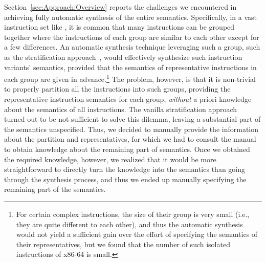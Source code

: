 Section~\ref{sec:Approach:Overview} reports the challenges we encountered in achieving fully automatic synthesis of the entire \ISA semantics.
Specifically, in a vast instruction set like \ISA {}, it is common that many instructions can be grouped together where the instructions of each group are similar to each other except for a few differences.
An automatic synthesis technique leveraging such a group, such as the stratification approach~\cite{Heule2016a}, would effectively synthesize such instruction variants' semantics, provided that the semantics of representative instructions in each group are given in advance.\footnote{For certain complex instructions, the size of their group is very small (i.e., they are quite different to each other), and thus the automatic synthesis would not yield a sufficient gain over the effort of specifying the semantics of their representatives, but we found that the number of such isolated instructions of x86-64 is small.}
The problem, however, is that it is non-trivial to properly partition all the instructions into such groups, providing the representative instruction semantics for each group, \emph{without} a priori knowledge about the semantics of all instructions.
The vanilla stratification approach~\cite{Heule2016a} turned out to be not sufficient to solve this dilemma, leaving a substantial part of the semantics unspecified.
Thus, we decided to manually provide the information about the partition and representatives, for which we had to consult the manual to obtain knowledge about the remaining part of semantics.
Once we obtained the required knowledge, however, we realized that it would be more straightforward to directly turn the knowledge into the semantics than going through the synthesis process, and thus we ended up manually specifying the remaining part of the semantics.


